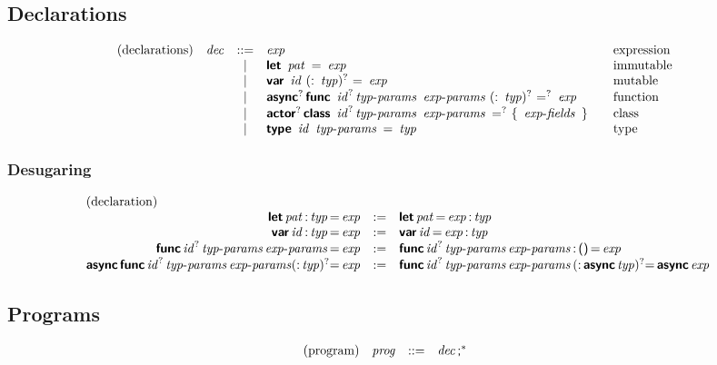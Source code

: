 \subsection*{Declarations}

$$
\begin{array}{@{}lrcl@{\qquad}l}
\text{(declarations)} & \x{dec} &::=&
  \x{exp}
    & \text{expression} \\&&|&
  \KK{let}~\x{pat}~\K=~\x{exp}
    & \text{immutable} \\&&|&
  \KK{var}~\x{id}~(\K:~\x{typ})^?~\K=~\x{exp}
    & \text{mutable} \\&&|&
  \KK{async}^?\, \KK{func}~\x{id}^? \x{typ-params}~\x{exp-params}~(\K:~\x{typ})^?~\K=^?~\x{exp}
    & \text{function} \\&&|&
  \KK{actor}^?\, \KK{class}~\x{id}^? \x{typ-params}~\x{exp-params}~\K=^?~\K\{~\x{exp-fields}~\K\}
    & \text{class} \\&&|&
  \KK{type}~\x{id}~\x{typ-params}~\K=~\x{typ}
    & \text{type} \\%
\end{array}
$$

\subsubsection*{Desugaring}

$$
\begin{array}{@{}rcl@{}}
\text{(declaration)} \hfill \\
\KK{let} \x{pat} \K: \x{typ} \K= \x{exp} &:=&
  \KK{let} \x{pat} \K= \x{exp} \K: \x{typ} \\
\KK{var} \x{id} \K: \x{typ} \K= \x{exp} &:=&
  \KK{var} \x{id} \K= \x{exp} \K: \x{typ} \\
\KK{func} \x{id}^? \x{typ-params} \x{exp-params} \K= \x{exp} &:=&
  \KK{func} \x{id}^? \x{typ-params} \x{exp-params} \K: \, \K{()} \, \K= \x{exp} \\
\KK{async} \, \KK{func} \x{id}^? \x{typ-params} \x{exp-params} (\K: \x{typ})^? \K= \x{exp} &:=&
\KK{func} \x{id}^? \x{typ-params} \x{exp-params} \, (\K: \, \KK{async} \x{typ})^? \K= \, \KK{async} \x{exp} \\
\end{array}
$$


\subsection*{Programs}

$$
\begin{array}{@{}lrcl@{\qquad}l}
\text{(program)} & \x{prog} &::=&
  \x{dec}\K;^\ast
\end{array}
$$
